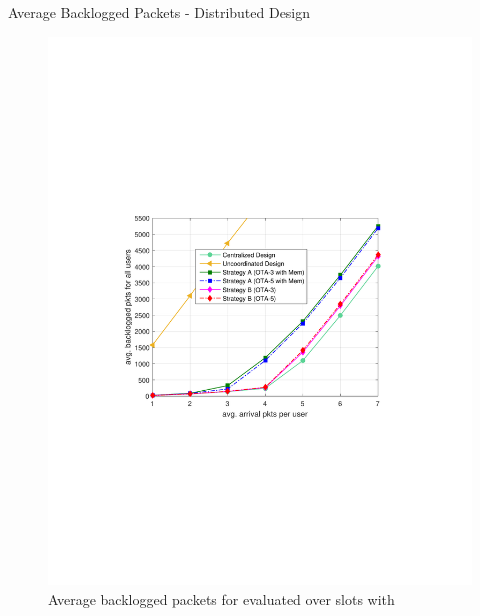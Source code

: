 \documentclass[9pt]{beamer}
\begin{document}
\begin{frame}{Average Backlogged Packets - Distributed Design}
	\begin{figure}
		\centering
		\includegraphics[trim=5mm 90mm 5mm 90mm,clip, width=\columnwidth]{ICC-A-B-1}
		\caption{Average backlogged packets for  evaluated over  slots with }
		\label{fig-1}
	\end{figure}
\end{frame}
\end{document}
